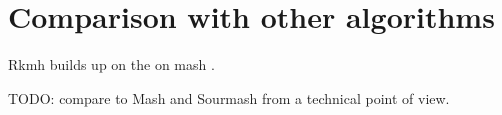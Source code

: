 \section{Comparison with other algorithms}


Rkmh builds up on the on mash \cite{mash}.

TODO: compare to Mash \cite{mash} and Sourmash \cite{sourmash} from a technical point of view.\\